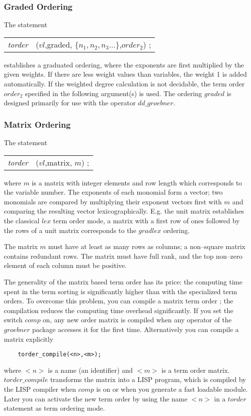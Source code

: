 \subsubsection{Graded Ordering}
 
The statement
\begin{center}
\begin{tabular}{cl}
{\it torder} &($vl$,graded, $\{n_1,n_2,n_3 \ldots\}$,$order_2$) ; \\
\end{tabular}
\end{center}
establishes a graduated ordering, where the exponents are first
multiplied by the given weights. If there are less weight values than
variables, the weight 1 is added automatically. If the weighted
degree calculation is not decidable, the term order $order_2$ specified
in the following argument(s) is used.  The ordering $graded$ is designed
primarily for use with the operator $dd\_groebner$.

\subsubsection{Matrix Ordering}
 
The statement
\begin{center}
\begin{tabular}{cl}
{\it torder} &($vl$,matrix, $m$) ; \\
\end{tabular}
\end{center}
where $m$ is a matrix with integer elements and row length which
corresponds to the variable number. The exponents of each monomial
form a vector; two monomials are compared by multiplying their
exponent vectors first with $m$ and comparing the resulting vector
lexicographically. E.g. the unit matrix establishes the classical
$lex$ term order mode, a matrix with a first row of ones followed
by the rows of a unit matrix corresponds to the $gradlex$ ordering.

The matrix $m$ must have at least as many rows as columns; a non--square
matrix contains redundant rows. The matrix must have full rank, and
the top non--zero element of each column must be positive.

The generality of the matrix based term order has its price: the
computing time spent in the term sorting is significantly higher
than with the specialized term orders. To overcome this problem,
you can compile a matrix term order ; the
compilation reduces the computing time overhead significantly.
If you set the switch $comp$ on, any new order matrix is compiled
when any operator of the $groebner$ package accesses it for the
first time. Alternatively you can compile a matrix explicitly
\begin{verbatim}
    torder_compile(<n>,<m>);
\end{verbatim}
where $<n>$ is a name (an identifier) and $<m>$ is a term order matrix.
$torder\_compile$ transforms the matrix into a LISP program, which
is compiled by the LISP compiler when $comp$ is on or when you
generate a fast loadable module. Later you can activate the new term
order by using the name $<n>$ in a $torder$ statement as term ordering
mode.

